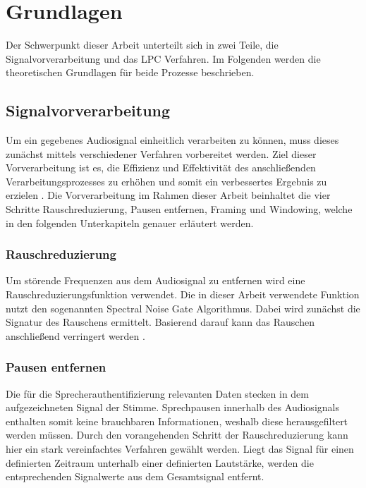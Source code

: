 \section{Grundlagen}\label{sec:Grundlagen}
Der Schwerpunkt dieser Arbeit unterteilt sich in zwei Teile, die Signalvorverarbeitung und das \ac{LPC} Verfahren.
Im Folgenden werden die theoretischen Grundlagen für beide Prozesse beschrieben.

\subsection{Signalvorverarbeitung}
Um ein gegebenes Audiosignal einheitlich verarbeiten zu können, muss dieses zunächst mittels verschiedener Verfahren vorbereitet werden.
Ziel dieser Vorverarbeitung ist es, die Effizienz und Effektivität des anschließenden Verarbeitungsprozesses zu erhöhen und somit ein verbessertes Ergebnis zu erzielen \autocite[vgl.][S. 11672]{lokesh_speech_2019}.
Die Vorverarbeitung im Rahmen dieser Arbeit beinhaltet die vier Schritte Rauschreduzierung, Pausen entfernen, Framing und Windowing, welche in den folgenden Unterkapiteln genauer erläutert werden.

\subsubsection{Rauschreduzierung}
Um störende Frequenzen aus dem Audiosignal zu entfernen wird eine Rauschreduzierungsfunktion verwendet.
Die in dieser Arbeit verwendete Funktion nutzt den sogenannten Spectral Noise Gate Algorithmus.
Dabei wird zunächst die Signatur des Rauschens ermittelt.
Basierend darauf kann das Rauschen anschließend verringert werden \autocite[vgl.][S. 25]{kiapuchinski_spectral_2012}.

\subsubsection{Pausen entfernen}
Die für die Sprecherauthentifizierung relevanten Daten stecken in dem aufgezeichneten Signal der Stimme.
Sprechpausen innerhalb des Audiosignals enthalten somit keine brauchbaren Informationen, weshalb diese herausgefiltert werden müssen.
Durch den vorangehenden Schritt der Rauschreduzierung kann hier ein stark vereinfachtes Verfahren gewählt werden.
Liegt das Signal für einen definierten Zeitraum unterhalb einer definierten Lautstärke, werden die entsprechenden Signalwerte aus dem Gesamtsignal entfernt.

